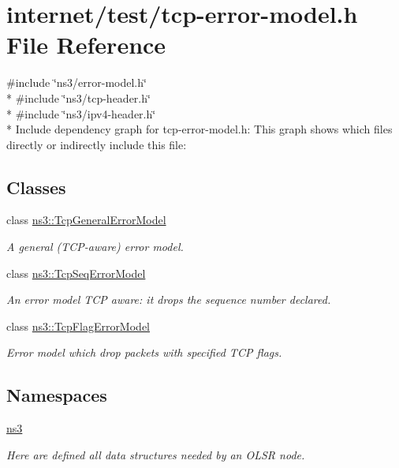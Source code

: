 \hypertarget{tcp-error-model_8h}{}\section{internet/test/tcp-\/error-\/model.h File Reference}
\label{tcp-error-model_8h}
{\ttfamily \#include \char`\"{}ns3/error-\/model.\+h\char`\"{}}\\*
{\ttfamily \#include \char`\"{}ns3/tcp-\/header.\+h\char`\"{}}\\*
{\ttfamily \#include \char`\"{}ns3/ipv4-\/header.\+h\char`\"{}}\\*
Include dependency graph for tcp-\/error-\/model.h\+:
This graph shows which files directly or indirectly include this file\+:
\subsection*{Classes}
\begin{DoxyCompactItemize}
\item 
class \hyperlink{classns3_1_1TcpGeneralErrorModel}{ns3\+::\+Tcp\+General\+Error\+Model}
\begin{DoxyCompactList}\small\item\em A general (T\+C\+P-\/aware) error model. \end{DoxyCompactList}\item 
class \hyperlink{classns3_1_1TcpSeqErrorModel}{ns3\+::\+Tcp\+Seq\+Error\+Model}
\begin{DoxyCompactList}\small\item\em An error model T\+CP aware\+: it drops the sequence number declared. \end{DoxyCompactList}\item 
class \hyperlink{classns3_1_1TcpFlagErrorModel}{ns3\+::\+Tcp\+Flag\+Error\+Model}
\begin{DoxyCompactList}\small\item\em Error model which drop packets with specified T\+CP flags. \end{DoxyCompactList}\end{DoxyCompactItemize}
\subsection*{Namespaces}
\begin{DoxyCompactItemize}
\item 
 \hyperlink{namespacens3}{ns3}
\begin{DoxyCompactList}\small\item\em Here are defined all data structures needed by an O\+L\+SR node. \end{DoxyCompactList}\end{DoxyCompactItemize}
